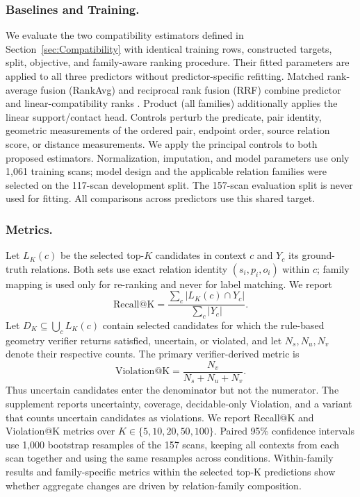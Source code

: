 \subsubsection{Baselines and Training.}
We evaluate the two compatibility estimators defined in Section~\ref{sec:Compatibility} with identical training rows, constructed targets, split, objective, and family-aware ranking procedure. Their fitted parameters are applied to all three predictors without predictor-specific refitting. Matched rank-average fusion (RankAvg) and reciprocal rank fusion (RRF) combine predictor and linear-compatibility ranks \cite{10.1145/1571941.1572114}. Product (all families) additionally applies the linear support/contact head. Controls perturb the predicate, pair identity, geometric measurements of the ordered pair, endpoint order, source relation score, or distance measurements. We apply the principal controls to both proposed estimators.
Normalization, imputation, and model parameters use only 1,061 training scans; model design and the applicable relation families were selected on the 117-scan development split. The 157-scan evaluation split is never used for fitting. All comparisons across predictors use this shared target.

\subsubsection{Metrics.}
Let $L_K(c)$ be the selected top-$K$ candidates in context $c$ and $Y_c$ its ground-truth relations. Both sets use exact relation identity $(s_i,p_i,o_i)$ within $c$; family mapping is used only for re-ranking and never for label matching. We report
\begin{equation}
\mathrm{Recall@K}=\frac{\sum_c |L_K(c)\cap Y_c|}{\sum_c |Y_c|}.
\end{equation}
Let $D_K\subseteq\bigcup_c L_K(c)$ contain selected candidates for which the rule-based geometry verifier returns satisfied, uncertain, or violated, and let $N_s,N_u,N_v$ denote their respective counts. The primary verifier-derived metric is
\begin{equation}
\mathrm{Violation@K}=\frac{N_v}{N_s+N_u+N_v}.
\end{equation}
Thus uncertain candidates enter the denominator but not the numerator. 
The supplement reports uncertainty, coverage, decidable-only Violation, and a variant that counts uncertain candidates as violations.
We report Recall@K and Violation@K metrics over $K \in \{5, 10, 20, 50, 100\}$. Paired 95\% confidence intervals use 1,000 bootstrap resamples of the 157 scans, keeping all contexts from each scan together and using the same resamples across conditions. Within-family results and family-specific metrics within the selected top-K predictions show whether aggregate changes are driven by relation-family composition.

